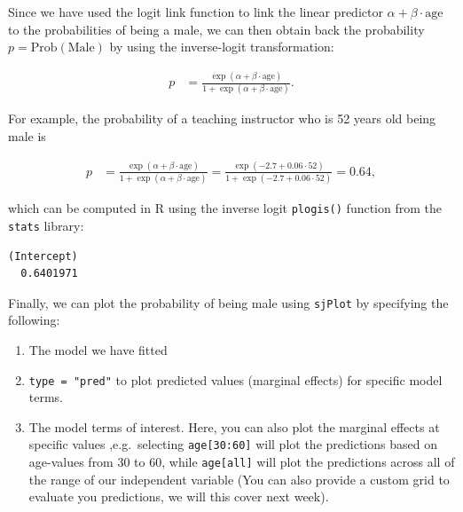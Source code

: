\documentclass[
  letterpaper,
  DIV=11,
  numbers=noendperiod]{scrartcl}
\newenvironment{Shaded}{\begin{snugshade}}{\end{snugshade}}
\newcommand{\DecValTok}[1]{\textcolor[rgb]{0.68,0.00,0.00}{#1}}
\newcommand{\FunctionTok}[1]{\textcolor[rgb]{0.28,0.35,0.67}{#1}}
\newcommand{\NormalTok}[1]{\textcolor[rgb]{0.00,0.23,0.31}{#1}}
\newcommand{\SpecialCharTok}[1]{\textcolor[rgb]{0.37,0.37,0.37}{#1}}
\begin{document}
Since we have used the logit link function to link the linear predictor
\(\alpha + \beta \cdot \textrm{age}\) to the probabilities of being a
male, we can then obtain back the probability
\(p = \textrm{Prob}(\textrm{Male})\) by using the inverse-logit
transformation:

\begin{align}
p &= \frac{\exp\left(\alpha + \beta \cdot \textrm{age} \right)}{1 + \exp\left(\alpha + \beta \cdot \textrm{age} \right)} . \nonumber
\end{align}

For example, the probability of a teaching instructor who is 52 years
old being male is

\begin{align}
p &= \frac{\exp\left(\alpha + \beta \cdot \textrm{age} \right)}{1 + \exp\left(\alpha + \beta \cdot \textrm{age} \right)}
=\frac{\exp\left(-2.7 + 0.06\cdot 52 \right)}{1 + \exp\left(-2.7 + 0.06\cdot 52 \right)} 
= 0.64, \nonumber
\end{align}

which can be computed in R using the inverse logit \texttt{plogis()}
function from the \texttt{stats} library:

\begin{Shaded}
\end{Shaded}

\begin{verbatim}
(Intercept) 
  0.6401971 
\end{verbatim}

Finally, we can plot the probability of being male using \texttt{sjPlot}
by specifying the following:

\begin{enumerate}
\def\labelenumi{\arabic{enumi}.}
\item
  The model we have fitted
\item
  \texttt{type\ =\ "pred"} to plot predicted values (marginal effects)
  for specific model terms.
\item
  The model terms of interest. Here, you can also plot the marginal
  effects at specific values ,e.g.~selecting \texttt{age{[}30:60{]}}
  will plot the predictions based on age-values from 30 to 60, while
  \texttt{age{[}all{]}} will plot the predictions across all of the
  range of our independent variable (You can also provide a custom grid
  to evaluate you predictions, we will this cover next week).
\end{enumerate}
\end{document}

